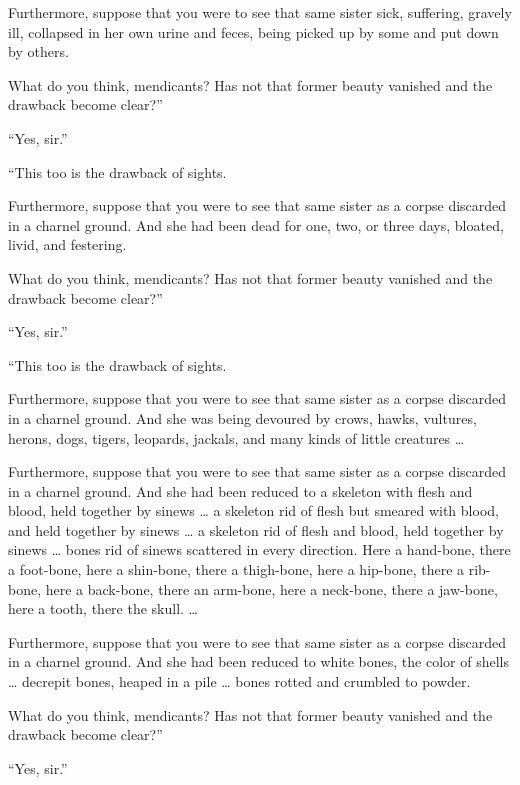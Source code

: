 \documentclass[12pt,openany]{book}%
\begin{document}
Furthermore, suppose that you were to see that same sister sick, suffering, gravely ill, collapsed in her own urine and feces, being picked up by some and put down by others. 

What do you think, mendicants? Has not that former beauty vanished and the drawback become clear?” 

“Yes, sir.” 

“This too is the drawback of sights. 

Furthermore, suppose that you were to see that same sister as a corpse discarded in a charnel ground. And she had been dead for one, two, or three days, bloated, livid, and festering. 

What do you think, mendicants? Has not that former beauty vanished and the drawback become clear?” 

“Yes, sir.” 

“This too is the drawback of sights. 

Furthermore, suppose that you were to see that same sister as a corpse discarded in a charnel ground. And she was being devoured by crows, hawks, vultures, herons, dogs, tigers, leopards, jackals, and many kinds of little creatures … 

Furthermore, suppose that you were to see that same sister as a corpse discarded in a charnel ground. And she had been reduced to a skeleton with flesh and blood, held together by sinews … a skeleton rid of flesh but smeared with blood, and held together by sinews … a skeleton rid of flesh and blood, held together by sinews … bones rid of sinews scattered in every direction. Here a hand-bone, there a foot-bone, here a shin-bone, there a thigh-bone, here a hip-bone, there a rib-bone, here a back-bone, there an arm-bone, here a neck-bone, there a jaw-bone, here a tooth, there the skull. … 

Furthermore, suppose that you were to see that same sister as a corpse discarded in a charnel ground. And she had been reduced to white bones, the color of shells … decrepit bones, heaped in a pile … bones rotted and crumbled to powder. 

What do you think, mendicants? Has not that former beauty vanished and the drawback become clear?” 

“Yes, sir.” 
\end{document}
